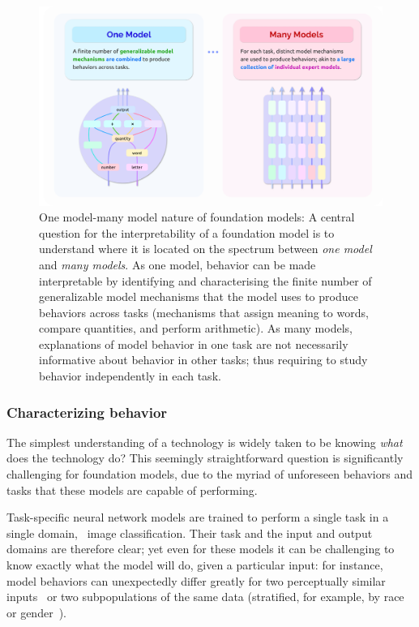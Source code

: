 \begin{figure}[!ht]
    \centering
    \includegraphics[width=\linewidth]{technology/figures/Interpretability.png}
    \caption{One model-many model nature of foundation models: A central question for the interpretability of a foundation model is to understand where it is located on the spectrum between \textit{one model} and \textit{many models}. As one model, behavior can be made interpretable by identifying and characterising the finite number of generalizable model mechanisms that the model uses to produce behaviors across tasks (\eg mechanisms that assign meaning to words, compare quantities, and perform arithmetic). As many models, explanations of model behavior in one task are not necessarily informative about behavior in other tasks; thus requiring to study behavior independently in each task.}
    \label{fig:intrp}
\end{figure}


\subsubsection{Characterizing behavior}
\label{sec:interpretability-behavior}

The simplest understanding of a technology is widely taken to be knowing \textit{what} does the technology do?
This seemingly straightforward question is significantly challenging for foundation models, due to the myriad of unforeseen behaviors and tasks that these models are capable of performing. 

Task-specific neural network models are trained to perform a single task in a single domain, \eg~image classification.
Their task and the input and output domains are therefore clear; yet even for these models it can be challenging to know exactly what the model will do, given a particular input: for instance, model behaviors can unexpectedly differ greatly for two perceptually similar inputs~\citep{garg2020bae,jin2020bert} or two subpopulations of the same data (stratified, for example, by race or gender~\citep{hovy2015,blodgett2016,tatman2017,buolamwini2018gender}).

